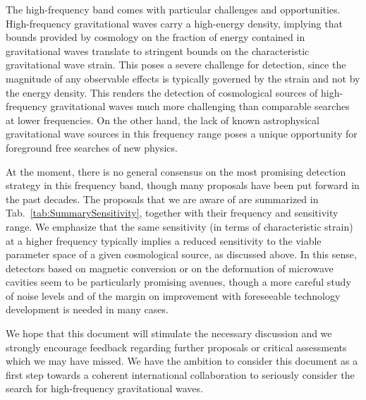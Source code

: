 \documentclass[11pt,a4paper]{article}
\begin{document}
The high-frequency band comes with particular challenges and opportunities. High-frequency gravitational waves carry a high-energy density, implying that bounds provided by cosmology on the fraction of energy contained in gravitational waves translate to stringent bounds on the characteristic gravitational wave strain. This poses a severe challenge for detection, since the magnitude of any observable effects is typically governed by the strain and not by the energy density. This renders the detection of cosmological sources of high-frequency gravitational waves much more challenging than comparable searches at lower frequencies. On the other hand, the lack of known astrophysical gravitational wave sources in this frequency range poses a unique opportunity for foreground free searches of new physics.

At the moment, there is no general consensus on the most promising detection strategy in this frequency band, though many proposals have been put forward in the past decades. The proposals that we are aware of are summarized in Tab.~\ref{tab:SummarySensitivity}, together with their frequency and sensitivity range. We emphasize that the same sensitivity (in terms of characteristic strain) at a higher frequency typically implies a reduced sensitivity to the viable parameter space of a given cosmological source, as discussed above. In this sense, detectors based on magnetic conversion or on the deformation of microwave cavities seem to be particularly promising avenues, though a more careful study of noise levels and of the margin on improvement with foreseeable technology development is needed in many cases.

We hope that this document will stimulate the necessary discussion and we strongly encourage feedback regarding further proposals or critical assessments which we may have missed. We have the ambition to consider this document as a first step towards a coherent international collaboration to seriously consider the search for high-frequency gravitational waves.
\end{document}
